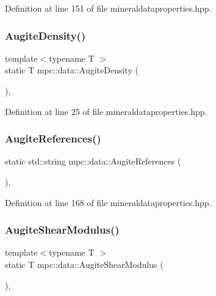 Definition at line 151 of file mineraldataproperties.\+hpp.

\mbox{\label{namespacempc_1_1data_a99f590b7a21e45586f10959610917f50}} 
\subsubsection{\texorpdfstring{Augite\+Density()}{AugiteDensity()}}
{\footnotesize\ttfamily template$<$typename T $>$ \\
static T mpc\+::data\+::\+Augite\+Density (\begin{DoxyParamCaption}{ }\end{DoxyParamCaption})\hspace{0.3cm}{\ttfamily [inline]}, {\ttfamily [static]}}



Definition at line 25 of file mineraldataproperties.\+hpp.

\mbox{\label{namespacempc_1_1data_aa182e1c0a37db3283f62de64b49a7677}} 
\subsubsection{\texorpdfstring{Augite\+References()}{AugiteReferences()}}
{\footnotesize\ttfamily static std\+::string mpc\+::data\+::\+Augite\+References (\begin{DoxyParamCaption}{ }\end{DoxyParamCaption})\hspace{0.3cm}{\ttfamily [inline]}, {\ttfamily [static]}}



Definition at line 168 of file mineraldataproperties.\+hpp.

\mbox{\label{namespacempc_1_1data_a7d5269d1222a5af21c30548f3817b471}} 
\subsubsection{\texorpdfstring{Augite\+Shear\+Modulus()}{AugiteShearModulus()}}
{\footnotesize\ttfamily template$<$typename T $>$ \\
static T mpc\+::data\+::\+Augite\+Shear\+Modulus (\begin{DoxyParamCaption}{ }\end{DoxyParamCaption})\hspace{0.3cm}{\ttfamily [inline]}, {\ttfamily [static]}}



